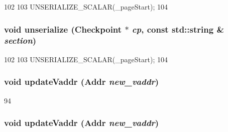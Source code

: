 \begin{DoxyCode}
102     {
103         UNSERIALIZE_SCALAR(_pageStart);
104     }
\end{DoxyCode}
\hypertarget{structMipsISA_1_1TlbEntry_af22e5d6d660b97db37003ac61ac4ee49}{
\subsubsection[{unserialize}]{\setlength{\rightskip}{0pt plus 5cm}void unserialize ({\bf Checkpoint} $\ast$ {\em cp}, \/  const std::string \& {\em section})}}
\label{structMipsISA_1_1TlbEntry_af22e5d6d660b97db37003ac61ac4ee49}



\begin{DoxyCode}
102     {
103         UNSERIALIZE_SCALAR(_pageStart);
104     }
\end{DoxyCode}
\hypertarget{structMipsISA_1_1TlbEntry_a5b72666b92ee0adbe9a7d218a0343754}{
\subsubsection[{updateVaddr}]{\setlength{\rightskip}{0pt plus 5cm}void updateVaddr ({\bf Addr} {\em new\_\-vaddr})}}
\label{structMipsISA_1_1TlbEntry_a5b72666b92ee0adbe9a7d218a0343754}



\begin{DoxyCode}
94 {}
\end{DoxyCode}
\hypertarget{structMipsISA_1_1TlbEntry_a5b72666b92ee0adbe9a7d218a0343754}{
\subsubsection[{updateVaddr}]{\setlength{\rightskip}{0pt plus 5cm}void updateVaddr ({\bf Addr} {\em new\_\-vaddr})}}
\label{structMipsISA_1_1TlbEntry_a5b72666b92ee0adbe9a7d218a0343754}



